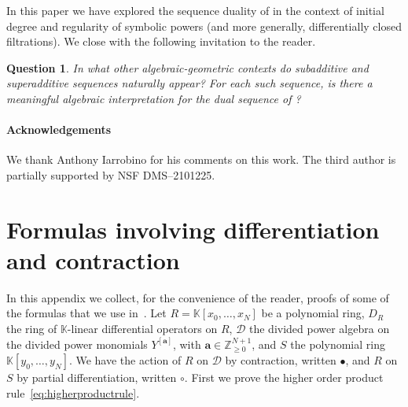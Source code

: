 \documentclass[12pt, reqno]{amsart}
\numberwithin{equation}{section}
\newcommand{\ba}{\mathbf{a}}
\newcommand{\Z}{{\mathbb Z}}
\newcommand{\kk}{\mathbb{K}}
\newcommand{\contract}{\bullet}
\theoremstyle{plain} %
\newtheorem{question}[thm]{Question}
\theoremstyle{definition}
\theoremstyle{remark}
\begin{document}
In this paper we have explored the sequence duality of  in the context of initial degree and regularity of symbolic powers (and more generally, differentially closed filtrations).  We close with the following invitation to the reader.

\begin{question}
In what other algebraic-geometric contexts do subadditive and superadditive sequences naturally appear?  For each such sequence, is there a meaningful algebraic interpretation for the dual sequence of ?
\end{question}

\paragraph{\bf Acknowledgements} We thank Anthony Iarrobino for his comments on this work. The third author is partially supported by NSF DMS--2101225.




\appendix

\section{Formulas involving differentiation and contraction}\label{app:formulas}

In this appendix we collect, for the convenience of the reader, proofs of some of the formulas that we use in~.  Let $R=\kk[x_0,\ldots,x_N]$ be a polynomial ring, $D_R$ the ring of $\kk$-linear differential operators on $R$, $\mathcal{D}$ the divided power algebra on the divided power monomials $Y^{[\mathbf{a}]}$, with $\ba\in\Z^{N+1}_{\ge 0}$, and $S$ the polynomial ring $\kk[y_0,\ldots,y_N]$.  We have the action of $R$ on $\mathcal{D}$ by contraction, written $\contract$, and $R$ on $S$ by partial differentiation, written $\circ$.  First we prove the higher order product rule~\eqref{eq:higherproductrule}.
\end{document}
